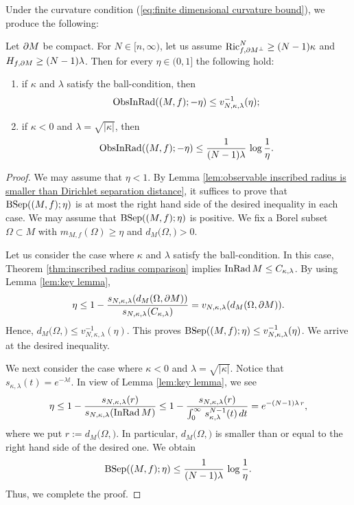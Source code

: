 Under the curvature condition (\ref{eq:finite dimensional curvature bound}),
we produce the following:
\begin{thm}\label{thm:weighted main theorem}
Let $\partial M$ be compact.
For $N\in [n,\infty)$,
let us assume $\operatorname{Ric}^{N}_{f,\partial M^{\perp}}\geq(N-1)\kappa$ and $H_{f,\partial M}\geq (N-1)\lambda$.
Then for every $\eta \in (0,1]$
the following hold:
\begin{enumerate}
\item if $\kappa$ and $\lambda$ satisfy the ball-condition,
         then
         \begin{equation*}
         \operatorname{ObsInRad}((M,f);-\eta) \leq v^{-1}_{N,\kappa,\lambda}(\eta);
         \end{equation*}
\item if $\kappa<0$ and $\lambda=\sqrt{\vert \kappa \vert}$,
         then
         \begin{equation*}
         \operatorname{ObsInRad}((M,f);-\eta) \leq \frac{1}{(N-1)\lambda}\,\log \frac{1}{\eta}.
         \end{equation*}
\end{enumerate}
\end{thm}
\begin{proof}
We may assume that $\eta<1$.
By Lemma \ref{lem:observable inscribed radius is smaller than Dirichlet separation distance},
it suffices to prove that
$\operatorname{BSep}((M,f);\eta)$ is at most the right hand side of the desired inequality in each case.
We may assume that
$\operatorname{BSep}((M,f);\eta)$ is positive.
We fix a Borel subset $\Omega \subset M$ with $m_{M,f}(\Omega)\geq \eta$ and $d_{M}(\Omega,\bm)>0$.

Let us consider the case where
$\kappa$ and $\lambda$ satisfy the ball-condition.
In this case,
Theorem \ref{thm:inscribed radius comparison} implies $\operatorname{InRad} M\leq C_{\kappa,\lambda}$.
By using Lemma \ref{lem:key lemma},
\begin{equation*}
\eta \leq 1-\frac{s_{N,\kappa,\lambda}(d_{M}(\Omega,\partial M))}{s_{N,\kappa,\lambda}(C_{\kappa,\lambda})}=v_{N,\kappa,\lambda}(d_{M}(\Omega,\partial M)).
\end{equation*}
Hence,
$d_{M}(\Omega,\bm) \leq v^{-1}_{N,\kappa,\lambda}(\eta)$.
This proves $\operatorname{BSep}((M,f);\eta)\leq v^{-1}_{N,\kappa,\lambda}(\eta)$.
We arrive at the desired inequality.

We next consider the case where
$\kappa<0$ and $\lambda=\sqrt{\vert \kappa \vert}$.
Notice that $s_{\kappa,\lambda}(t)=e^{-\lambda t}$.
In view of Lemma \ref{lem:key lemma},
we see
\begin{equation*}
\eta \leq 1-\frac{s_{N,\kappa,\lambda}(r)}{s_{N,\kappa,\lambda}(\operatorname{InRad} M)} \leq 1-\frac{s_{N,\kappa,\lambda}(r)}{\int^{\infty}_{0}\, s^{N-1}_{\kappa,\lambda}(t)\,dt}=e^{-(N-1)\lambda \,r},
\end{equation*}
where we put $r:=d_{M}(\Omega,\bm)$.
In particular,
$d_{M}(\Omega,\bm)$ is smaller than or equal to the right hand side of the desired one.
We obtain
\begin{equation*}
\operatorname{BSep}((M,f);\eta)\leq \frac{1}{(N-1)\lambda}\,\log \frac{1}{\eta}.
\end{equation*}
Thus,
we complete the proof.
\end{proof}

